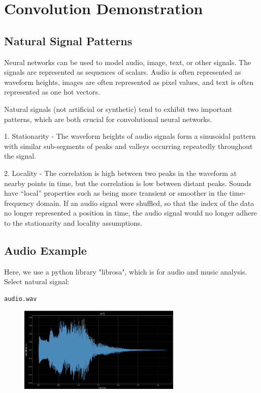 \chapter{Convolution Demonstration}
\section{Natural Signal Patterns}
Neural networks can be used to model audio, image, text, or other signals. The signals are represented as sequences of scalars. Audio is often represented as waveform heights, images are often represented as pixel values, and text is often represented as one hot vectors.

Natural signals (not artificial or synthetic) tend to exhibit two important patterns, which are both crucial for convolutional neural networks.

1. Stationarity - The waveform heights of audio signals form a sinusoidal pattern with similar sub-segments of peaks and valleys occurring repeatedly throughout the signal.

2. Locality - The correlation is high between two peaks in the waveform at nearby points in time, but the correlation is low between distant peaks. Sounds have “local” properties such as being more transient or smoother in the time-frequency domain. If an audio signal were shuffled, so that the index of the data no longer represented a position in time, the audio signal would no longer adhere to the stationarity and locality assumptions.



\section{Audio Example}
Here, we use a python library "librosa", which is for audio and music analysis. Select natural signal: \begin{verbatim}audio.wav\end{verbatim}

\begin{figure}[H]
    \centering
    \includegraphics[width=220pt]{figs/1.png}
    \label{fig:waveform}
\end{figure}

